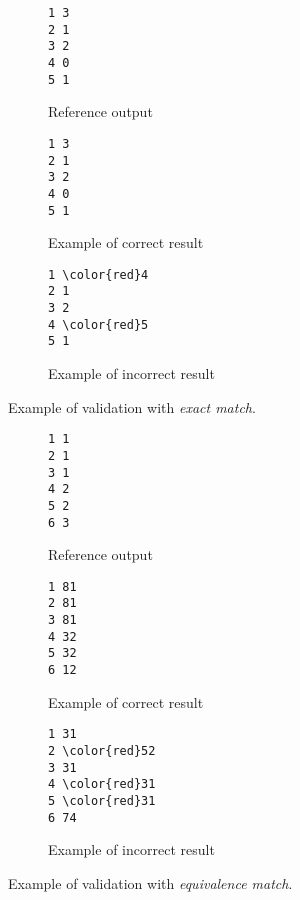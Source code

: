 \begin{figure}[h]
\centering
\begin{subfigure}{0.3\textwidth}
\begin{Verbatim}[frame=single]
1 3
2 1
3 2
4 0
5 1
\end{Verbatim}
\caption{Reference output}
\end{subfigure}
\begin{subfigure}{0.3\textwidth}
\begin{Verbatim}[frame=single]
1 3
2 1
3 2
4 0
5 1
\end{Verbatim}
\caption{Example of correct result}
\end{subfigure}
\begin{subfigure}{0.3\textwidth}
\begin{Verbatim}[frame=single,commandchars=\\\{\}]
1 \color{red}4
2 1
3 2
4 \color{red}5
5 1
\end{Verbatim}
\caption{Example of incorrect result}
\end{subfigure}
\caption{Example of validation with \emph{exact match}.}
\label{fig:definition_validation_exact}
\end{figure}


\begin{figure}[h]
\centering
\begin{subfigure}{0.3\textwidth}
\begin{Verbatim}[frame=single]
1 1
2 1
3 1
4 2
5 2
6 3
\end{Verbatim}
\caption{Reference output}
\end{subfigure}
\begin{subfigure}{0.3\textwidth}
\begin{Verbatim}[frame=single]
1 81
2 81
3 81
4 32
5 32
6 12
\end{Verbatim}
\caption{Example of correct result}
\end{subfigure}
\begin{subfigure}{0.3\textwidth}
\begin{Verbatim}[frame=single,commandchars=\\\{\}]
1 31
2 \color{red}52
3 31
4 \color{red}31
5 \color{red}31
6 74
\end{Verbatim}
\caption{Example of incorrect result}
\end{subfigure}
\caption{Example of validation with \emph{equivalence match}.}
\label{fig:definition_validation_equivalence}
\end{figure}


